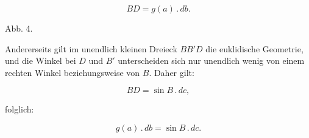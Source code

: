 \[
BD = g(a)\,.\,db.
\]

\begin{center}\begin{minipage}{\linewidth}\centering


Abb. 4.
\end{minipage}\end{center}

\noindent Andererseits gilt im unendlich kleinen Dreieck $BB'D$ die euklidische Geometrie, und die Winkel bei $D$ und $B'$ unterscheiden sich nur unendlich wenig von einem rechten Winkel beziehungsweise von $B$. Daher gilt:

\[
BD = \sin B\,.\,dc,
\]

\noindent folglich:

\[
\tag*{1)} g(a)\,.\,db = \sin B\,.\,dc.
\]

